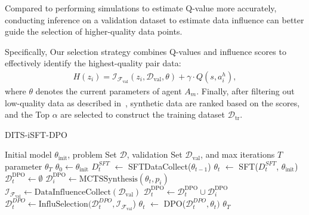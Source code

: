 Compared to performing simulations to estimate Q-value more accurately, conducting inference on a validation dataset to estimate data influence can better guide the selection of higher-quality data points.

Specifically, Our selection strategy combines Q-values and influence scores to effectively identify the highest-quality pair data: 
\begin{equation}
\begin{split}
    H(z_i) = \mathcal{I}_{\mathcal{F}_{\text{val}}}(z_i, \mathcal{D}_{\text{val}}, \theta) + \gamma \cdot Q(s, a_i^h) , 
    \label{equation:hybrid score}
\end{split}
\end{equation}
where $\theta$ denotes the current parameters of agent $A_m$. Finally, after filtering out low-quality data as described in~\citet{DBLP:journals/corr/abs-2410-08115}, synthetic data are ranked based on the scores, and the Top $\alpha$ are selected to construct the training dataset $\mathcal{D}_{\text{tr}}$.

{
\setlength{\textfloatsep}{0em}
\begin{algorithm}[t]
\caption{DITS-iSFT-DPO}
\label{alg:DITS-isft-dpo}
\begin{algorithmic}[1]
\REQUIRE Initial model $\theta_\text{init}$, problem Set $\mathcal{D}$, validation Set $\mathcal{D}_{\text{val}}$, and max iterations $T$
\ENSURE parameter $\theta_T$
\STATE $\theta_0 \gets \theta_\text{init}$
    \STATE $D_t^{SFT}$ $\gets$ SFTDataCollect($\theta_{t-1}$) 
    \STATE $\theta_t$ $\gets$ SFT($D_t^{SFT}$, $\theta_\text{init}$) 
    \STATE $\mathcal{D}_t^\text{DPO} \gets \emptyset$
        \STATE $\mathcal{D}_i^\text{DPO} \gets \text{MCTSSynthesis}(\theta_t, p_i)$ 
        \STATE $\mathcal{I}_{\mathcal{F}_{\text{val}}}\gets \text{DataInfluenceCollect}(\mathcal{D}_{\text{val}})$ 
        \STATE $\mathcal{D}_t^\text{DPO} \gets \mathcal{D}_t^\text{DPO} \cup \mathcal{D}_i^\text{DPO}$
    \ENDFOR
    \STATE $\mathcal{D}_t^{DPO} \gets \text{InfluSelection}(\mathcal{D}_t^{DPO}, \mathcal{I}_{\mathcal{F}_{\text{val}}}$)
    \STATE $\theta_{t}$ $\gets$ DPO($\mathcal{D}_t^{DPO}, \theta_t)$
\ENDFOR
\OUTPUT $\theta_T$
\end{algorithmic}
\end{algorithm}

}

